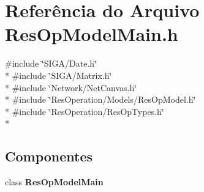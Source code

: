 \section{Referência do Arquivo Res\+Op\+Model\+Main.\+h}
\label{_res_op_model_main_8h}
{\ttfamily \#include \char`\"{}S\+I\+G\+A/\+Date.\+h\char`\"{}}\\*
{\ttfamily \#include \char`\"{}S\+I\+G\+A/\+Matrix.\+h\char`\"{}}\\*
{\ttfamily \#include \char`\"{}Network/\+Net\+Canvas.\+h\char`\"{}}\\*
{\ttfamily \#include \char`\"{}Res\+Operation/\+Models/\+Res\+Op\+Model.\+h\char`\"{}}\\*
{\ttfamily \#include \char`\"{}Res\+Operation/\+Res\+Op\+Types.\+h\char`\"{}}\\*
\subsection*{Componentes}
\begin{DoxyCompactItemize}
\item 
class {\bf Res\+Op\+Model\+Main}
\end{DoxyCompactItemize}
